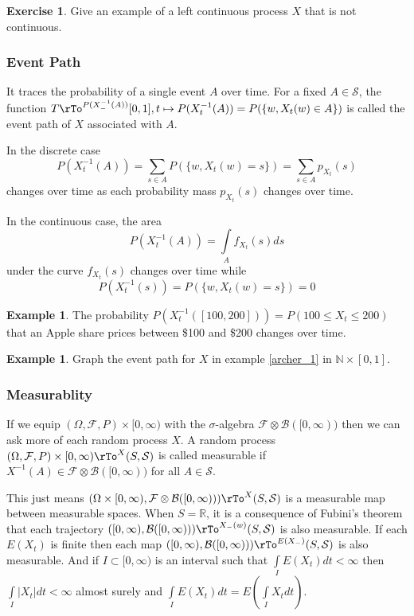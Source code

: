 \documentclass[12pt]{amsart}
\theoremstyle{definition}
\newtheorem{example}[theorem]{Example}
\newtheorem{exercise}[theorem]{Exercise}
\begin{document}
\begin{exercise} Give an example of a left continuous process $X$ that is not continuous.
\end{exercise}

\subsubsection{Event Path} It traces the probability of a single event $A$ over time.
\dfn For a fixed $A \in \mathcal{S}$, the function $T \rTo^{P(X^{-1}_-(A))} [0,1], t \mapsto P(X^{-1}_{t}(A)) = P(\{w, X_t(w) \in A\})$ is called the event path of $X$ associated with $A$.

In the discrete case
$$P(X^{-1}_{t}(A)) = \sum\limits_{s \in A} P(\{w, X_t(w) = s\}) = \sum\limits_{s \in A} p_{X_t}(s)$$
changes over time as each probability mass $p_{X_t}(s)$ changes over time.

In the continuous case, the area
$$P(X^{-1}_t(A)) =  \int\limits_{A} f_{X_t}(s) ds$$under the curve $f_{X_t}(s)$ changes over time while
$$P(X^{-1}_{t}(s)) = P(\{w, X_t(w) = s\}) = 0$$

\begin{example} The probability $P(X_t^{-1}([100,200])) = P(100 \leq X_t \leq 200)$ that an Apple share prices between \$100 and \$200 changes over time.
\end{example}

\begin{example} \label{archer_2} Graph the event path for $X$ in example \ref{archer_1} in $\mathbb{N} \times [0,1]$.
\end{example}

\subsubsection{Measurablity} If we equip $(\Omega, \mathcal{F}, P) \times [0,\infty)$ with the $\sigma$-algebra $\mathcal{F} \otimes \mathcal{B}([0,\infty))$ then we can ask more of each random process $X$.
\dfn A random process $(\Omega, \mathcal{F}, P) \times [0,\infty) \rTo^X (S, \mathcal{S})$ is called measurable if $X^{-1}(A) \in \mathcal{F} \otimes \mathcal{B}([0,\infty))$ for all $A \in \mathcal{S}$.

This just means $(\Omega \times [0,\infty), \mathcal{F} \otimes \mathcal{B}([0,\infty))) \rTo^X (S, \mathcal{S})$ is a measurable map between measurable spaces. When $S = \mathbb{R}$, it is a consequence of Fubini's theorem that each trajectory $([0,\infty), \mathcal{B}([0, \infty))) \rTo^{X_-(w)} (S, \mathcal{S})$ is also measurable. If each $E(X_t)$ is finite then each map $([0,\infty), \mathcal{B}([0, \infty))) \rTo^{E(X_-)} (S, \mathcal{S})$ is also measurable. And if $I \subset [0,\infty)$ is an interval such that $\int\limits_I E(X_t) dt < \infty$ then $\int\limits_I |X_t|dt < \infty$ almost surely and $\int\limits_I E(X_t) dt = E(\int\limits_I X_t dt)$.
\end{document}
